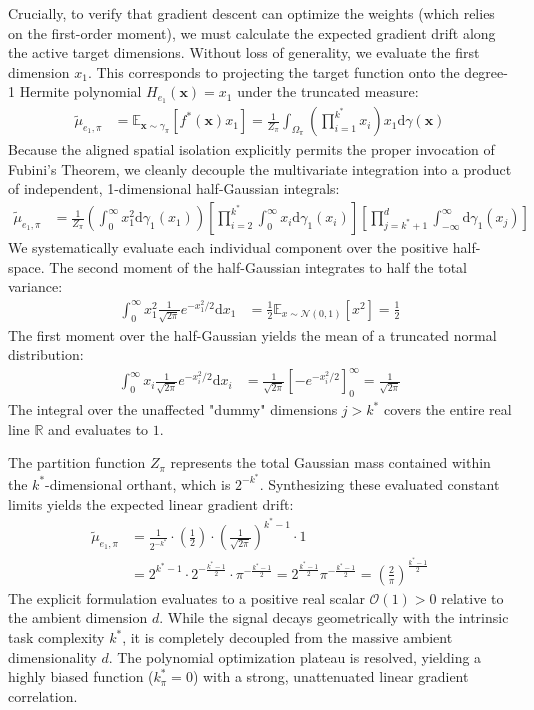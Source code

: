 \documentclass{article}
\newcommand{\E}{\mathbb{E}}
\newcommand{\R}{\mathbb{R}}
\newcommand{\1}{\mathbb{I}}
\newcommand{\diff}{\mathrm{d}}
\newcommand{\calO}{\mathcal{O}}
\newcommand{\bx}{\mathbf{x}}
\newcommand{\calN}{\mathcal{N}}
\begin{document}
Crucially, to verify that gradient descent can optimize the weights (which relies on the first-order moment), we must calculate the expected gradient drift along the active target dimensions. Without loss of generality, we evaluate the first dimension $x_1$. This corresponds to projecting the target function onto the degree-1 Hermite polynomial $H_{e_1}(\bx) = x_1$ under the truncated measure:
\begin{align}
    \tilde{\mu}_{e_1, \pi} &= \E_{\bx \sim \gamma_\pi}[f^*(\bx) x_1] = \frac{1}{Z_\pi} \int_{\Omega_\pi} \left( \prod_{i=1}^{k^*} x_i \right) x_1 \diff\gamma(\bx)
\end{align}
Because the aligned spatial isolation explicitly permits the proper invocation of Fubini's Theorem, we cleanly decouple the multivariate integration into a product of independent, 1-dimensional half-Gaussian integrals:
\begin{align}
    \tilde{\mu}_{e_1, \pi} &= \frac{1}{Z_\pi} \left( \int_0^\infty x_1^2 \diff\gamma_1(x_1) \right) \left[ \prod_{i=2}^{k^*} \int_0^\infty x_i \diff\gamma_1(x_i) \right] \left[ \prod_{j=k^*+1}^d \int_{-\infty}^\infty \diff\gamma_1(x_j) \right]
\end{align}
We systematically evaluate each individual component over the positive half-space. The second moment of the half-Gaussian integrates to half the total variance:
\begin{align}
    \int_0^\infty x_1^2 \frac{1}{\sqrt{2\pi}} e^{-x_1^2/2} \diff x_1 &= \frac{1}{2} \E_{x \sim \calN(0,1)}[x^2] = \frac{1}{2}
\end{align}
The first moment over the half-Gaussian yields the mean of a truncated normal distribution:
\begin{align}
    \int_0^\infty x_i \frac{1}{\sqrt{2\pi}} e^{-x_i^2/2} \diff x_i &= \frac{1}{\sqrt{2\pi}} \left[ -e^{-x_i^2/2} \right]_0^\infty = \frac{1}{\sqrt{2\pi}}
\end{align}
The integral over the unaffected "dummy" dimensions $j > k^*$ covers the entire real line $\R$ and evaluates to $1$. 

The partition function $Z_\pi$ represents the total Gaussian mass contained within the $k^*$-dimensional orthant, which is $2^{-k^*}$. Synthesizing these evaluated constant limits yields the expected linear gradient drift:
\begin{align}
    \tilde{\mu}_{e_1, \pi} &= \frac{1}{2^{-k^*}} \cdot \left(\frac{1}{2}\right) \cdot \left( \frac{1}{\sqrt{2\pi}} \right)^{k^*-1} \cdot 1 \nonumber \\
    &= 2^{k^*-1} \cdot 2^{-\frac{k^*-1}{2}} \cdot \pi^{-\frac{k^*-1}{2}} = 2^{\frac{k^*-1}{2}} \pi^{-\frac{k^*-1}{2}} = \left( \frac{2}{\pi} \right)^{\frac{k^*-1}{2}}
\end{align}
The explicit formulation evaluates to a positive real scalar $\calO(1) > 0$ relative to the ambient dimension $d$. While the signal decays geometrically with the intrinsic task complexity $k^*$, it is completely decoupled from the massive ambient dimensionality $d$. The polynomial optimization plateau is resolved, yielding a highly biased function ($k_\pi^* = 0$) with a strong, unattenuated linear gradient correlation.
\end{document}
